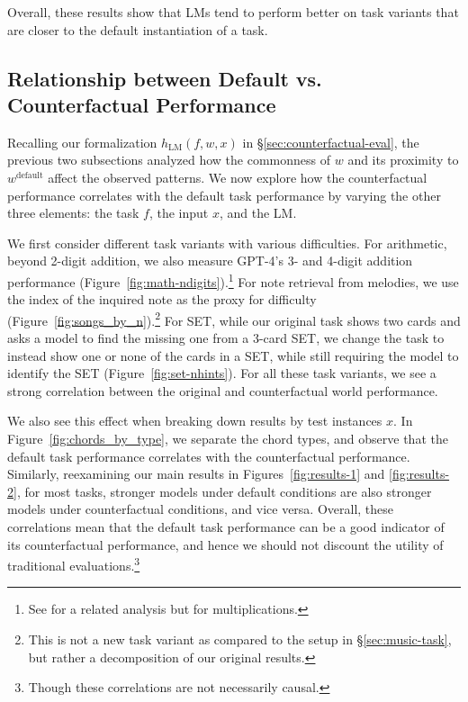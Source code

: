 Overall, these results show that LMs tend to perform better on task variants that are closer to the default instantiation of a task.

\subsection{Relationship between Default vs. Counterfactual Performance} \label{sec:rc-relationship}

Recalling our formalization $h_{\text{LM}}(f, w, x)$ in \S\ref{sec:counterfactual-eval}, the previous two subsections analyzed how  the commonness of $w$ and its proximity to $w^\text{default}$ affect the observed patterns. We now explore how the counterfactual performance correlates with the default task performance by varying the other three elements: the task $f$, the input $x$, and the LM.

We first consider different task variants with various difficulties.
For arithmetic, beyond 2-digit addition, we also measure GPT-4's 3- and 4-digit addition performance (Figure~\ref{fig:math-ndigits}).\footnote{See \citet{dziri2023faith} for a related analysis but for multiplications.}
For note retrieval from melodies, we use the index of the inquired note as the proxy for  difficulty (Figure~\ref{fig:songs_by_n}).\footnote{This is not a new task variant as compared to the setup in \S\ref{sec:music-task}, but rather a decomposition of our original results.}
For SET, while our original task shows two cards and asks a model to find the missing one from a 3-card SET, we change the task to instead show one or none of the cards in a SET, while still requiring the model to identify the SET (Figure~\ref{fig:set-nhints}).
For all these task variants, we see a strong correlation between the original and counterfactual world performance.

We also see this effect when breaking down results by test instances $x$. In Figure~\ref{fig:chords_by_type}, we separate the chord types, and observe that the default task performance correlates with the counterfactual performance. Similarly, reexamining our main results in Figures~\ref{fig:results-1} and \ref{fig:results-2}, for most tasks, stronger models under default conditions are also stronger models under counterfactual conditions, and vice versa.
Overall, these correlations mean that the default task performance can be a good indicator of its counterfactual performance, and hence we should not discount the utility of traditional evaluations.\footnote{Though these correlations are not necessarily causal.}

